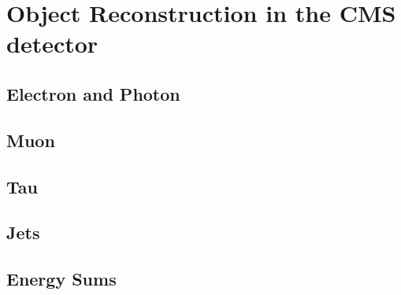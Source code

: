 \chapter{Object Reconstruction in the CMS detector}

\section{Electron and Photon}

\section{Muon}

\section{Tau}

\section{Jets}

\section{Energy Sums}